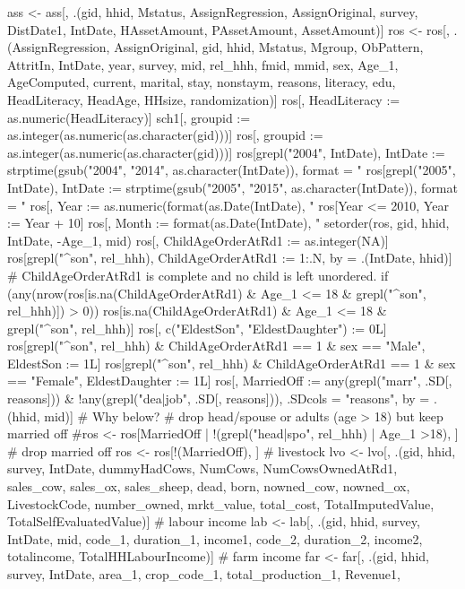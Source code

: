 \begin{Schunk}
\begin{Sinput}
ass <- ass[, .(gid, hhid, Mstatus, AssignRegression, AssignOriginal, survey, DistDate1, IntDate, HAssetAmount, PAssetAmount, AssetAmount)]
ros <- ros[, .(AssignRegression, AssignOriginal, 
  gid, hhid, Mstatus, Mgroup, ObPattern, AttritIn,
  IntDate, year, survey, 
  mid, rel_hhh, fmid, mmid, sex, Age_1, AgeComputed, 
  current, marital, stay, nonstaym, reasons, literacy, edu, 
  HeadLiteracy, HeadAge, HHsize, randomization)]
ros[, HeadLiteracy := as.numeric(HeadLiteracy)]
sch1[, groupid := as.integer(as.numeric(as.character(gid)))]
ros[, groupid := as.integer(as.numeric(as.character(gid)))]
ros[grepl("2004", IntDate), IntDate := 
  strptime(gsub("2004", "2014", as.character(IntDate)), format = "%Y-%m-%d")]
ros[grepl("2005", IntDate), IntDate := 
  strptime(gsub("2005", "2015", as.character(IntDate)), format = "%Y-%m-%d")]
ros[, Year := as.numeric(format(as.Date(IntDate), "%Y"))]
ros[Year <= 2010, Year := Year + 10]
ros[, Month := format(as.Date(IntDate), "%B")]
setorder(ros, gid, hhid, IntDate, -Age_1, mid)
ros[, ChildAgeOrderAtRd1 := as.integer(NA)]
ros[grepl("^son", rel_hhh), ChildAgeOrderAtRd1 := 1:.N, by = .(IntDate, hhid)]
# ChildAgeOrderAtRd1 is complete and no child is left unordered.
if (any(nrow(ros[is.na(ChildAgeOrderAtRd1) & Age_1 <= 18 & grepl("^son", rel_hhh)]) > 0))
  ros[is.na(ChildAgeOrderAtRd1) & Age_1 <= 18 & grepl("^son", rel_hhh)]
ros[, c("EldestSon", "EldestDaughter") := 0L]
ros[grepl("^son", rel_hhh) & ChildAgeOrderAtRd1 == 1 & sex == "Male", EldestSon := 1L]
ros[grepl("^son", rel_hhh) & ChildAgeOrderAtRd1 == 1 & sex == "Female", EldestDaughter := 1L]
ros[, MarriedOff := 
  any(grepl("marr", .SD[, reasons])) & 
  !any(grepl("dea|job", .SD[, reasons])), 
  .SDcols = "reasons", by = .(hhid, mid)]
# Why below?
# drop head/spouse or adults (age > 18) but keep married off
#ros <- ros[MarriedOff | !(grepl("head|spo", rel_hhh) | Age_1 >18), ]
# drop married off
ros <- ros[!(MarriedOff), ]
# livestock
lvo <- lvo[, .(gid, hhid, survey, IntDate, 
  dummyHadCows, NumCows, NumCowsOwnedAtRd1, 
  sales_cow, sales_ox, sales_sheep, dead, born, 
  nowned_cow, nowned_ox,
  LivestockCode, number_owned, mrkt_value, total_cost, 
  TotalImputedValue, TotalSelfEvaluatedValue)]
# labour income
lab <- lab[, .(gid, hhid, survey, IntDate, mid, 
  code_1, duration_1, income1, code_2, duration_2, income2, 
  totalincome, TotalHHLabourIncome)]
# farm income
far <- far[, .(gid, hhid, survey, IntDate, 
  area_1, crop_code_1, total_production_1, Revenue1, 

\end{Sinput}
\end{Schunk}
